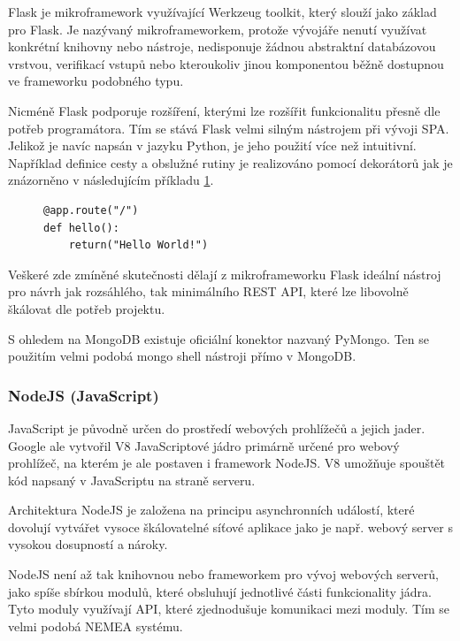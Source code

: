 Flask je mikroframework využívající Werkzeug toolkit, který slouží jako základ pro Flask. Je nazývaný mikroframeworkem, protože vývojáře nenutí využívat konkrétní knihovny nebo nástroje, nedisponuje žádnou abstraktní databázovou vrstvou, verifikací vstupů nebo kteroukoliv jinou komponentou běžně dostupnou ve frameworku podobného typu.

Nicméně Flask podporuje rozšíření, kterými lze rozšířit funkcionalitu přesně dle potřeb programátora. Tím se stává Flask velmi silným nástrojem při vývoji SPA. Jelikož je navíc napsán v jazyku Python, je jeho použití více než intuitivní. Například definice cesty a obslužné rutiny je realizováno pomocí dekorátorů jak je znázorněno v následujícím příkladu \ref{code:flask}.

\begin{figure}[ht]
\lstset{basicstyle=\small,style=JSON}
\begin{lstlisting}
@app.route("/")
def hello():
    return("Hello World!")
\end{lstlisting}
\label{code:flask}
\end{figure}

Veškeré zde zmíněné skutečnosti dělají z mikroframeworku Flask ideální nástroj pro návrh jak rozsáhlého, tak minimálního REST API, které lze libovolně škálovat dle potřeb projektu.

S ohledem na MongoDB existuje oficiální konektor nazvaný PyMongo. Ten se použitím velmi podobá mongo shell nástroji přímo v MongoDB. 

\subsubsection*{NodeJS (JavaScript)}

JavaScript je původně určen do prostředí webových prohlížečů a jejich jader. Google ale vytvořil V8\cite{google:v8} JavaScriptové jádro primárně určené pro webový prohlížeč, na kterém je ale postaven i framework NodeJS. V8 umožňuje spouštět kód napsaný v JavaScriptu na straně serveru.

Architektura NodeJS je založena na principu asynchronních událostí, které dovolují vytvářet vysoce škálovatelné síťové aplikace jako je např. webový server s vysokou dosupností a nároky.

NodeJS není až tak knihovnou nebo frameworkem pro vývoj webových serverů, jako spíše sbírkou modulů, které obsluhují jednotlivé části funkcionality jádra\cite{nodejs}. Tyto moduly využívají API, které zjednodušuje komunikaci mezi moduly. Tím se velmi podobá NEMEA systému.

